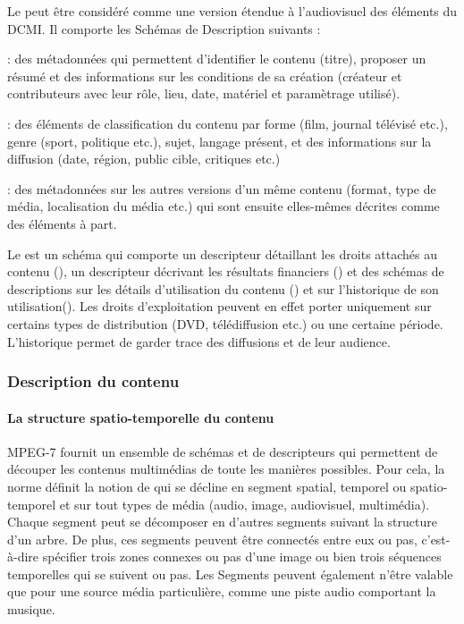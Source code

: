 Le  peut être considéré comme une version étendue à l'audiovisuel des éléments du DCMI. Il comporte les Schémas de Description suivants : 
	\begin{liste}
		\item {} : des métadonnées qui permettent d'identifier le contenu (titre), proposer un résumé et des informations sur les conditions de sa création (créateur et contributeurs avec leur rôle, lieu, date, matériel et paramètrage utilisé).

		\item {} : des éléments de classification du contenu par forme (film, journal télévisé etc.), genre (sport, politique etc.), sujet, langage présent, et des informations sur la diffusion (date, région, public cible, critiques etc.)

		\item {} : des métadonnées sur les autres versions d'un même contenu (format, type de média, localisation du média etc.) qui sont ensuite elles-mêmes décrites comme des éléments à part.
	\end{liste}

Le  est un schéma qui comporte un descripteur détaillant les droits attachés au contenu (), un descripteur décrivant les résultats financiers () et des schémas de descriptions sur les détails d'utilisation du contenu () et sur l'historique de son utilisation().
Les droits d'exploitation peuvent en effet porter uniquement sur certains types de distribution (DVD, télédiffusion etc.) ou une certaine période. 
L'historique permet de garder trace des diffusions et de leur audience.





\subsubsection{Description du contenu}
\paragraph{La structure spatio-temporelle du contenu}
MPEG-7 fournit un ensemble de schémas et de descripteurs qui permettent de découper les contenus multimédias de toute les manières possibles. 
Pour cela, la norme définit la notion de  qui se décline en segment spatial, temporel ou spatio-temporel et sur tout types de média (audio, image, audiovisuel, multimédia). 
Chaque segment peut se décomposer en d'autres segments suivant la structure d'un arbre. 
De plus, ces segments peuvent être connectés entre eux ou pas, c'est-à-dire spécifier trois zones connexes ou pas d'une image ou bien trois séquences temporelles qui se suivent ou pas. 
Les Segments peuvent également n'être valable que pour une source média particulière, comme une piste audio comportant la musique.

